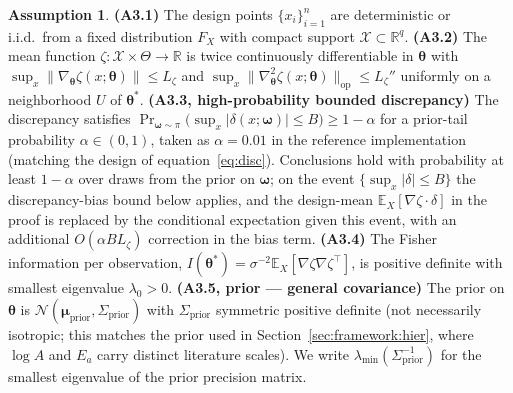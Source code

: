 \documentclass[12pt]{article}
\theoremstyle{plain}
\theoremstyle{definition}
\newtheorem{assumption}{Assumption}
\theoremstyle{remark}
\newcommand{\R}{\mathbb{R}}
\newcommand{\E}{\mathbb{E}}
\newcommand{\norm}[1]{\lVert #1 \rVert}
\begin{document}
\begin{assumption}\label{ass:thm3}
\textbf{(A3.1)} The design points $\{x_i\}_{i=1}^n$ are deterministic
or i.i.d.~from a fixed distribution $F_X$ with compact support
$\mathcal{X}\subset\R^q$.
\textbf{(A3.2)} The mean function $\zeta:\mathcal{X}\times\Theta\to\R$
is twice continuously differentiable in $\boldsymbol\theta$ with
$\sup_x\norm{\nabla_{\boldsymbol\theta}\zeta(x;\boldsymbol\theta)}\le
L_\zeta$ and $\sup_x\norm{\nabla^2_{\boldsymbol\theta}\zeta(x;\boldsymbol
\theta)}_{\mathrm{op}}\le L_\zeta''$ uniformly on a neighborhood $U$
of $\boldsymbol\theta^*$.
\textbf{(A3.3, high-probability bounded discrepancy)} The discrepancy
satisfies $\Pr_{\boldsymbol\omega\sim\pi}\bigl(\sup_x|\delta(x;\boldsymbol
\omega)|\le B\bigr)\ge 1-\alpha$ for a prior-tail probability
$\alpha\in(0,1)$, taken as $\alpha=0.01$ in the reference implementation
(matching the design of equation~\eqref{eq:disc}).  Conclusions hold with
probability at least $1-\alpha$ over draws from the prior on
$\boldsymbol\omega$; on the event $\{\sup_x|\delta|\le B\}$ the
discrepancy-bias bound below applies, and the design-mean
$\E_X[\nabla\zeta\cdot\delta]$ in the proof is replaced by the conditional
expectation given this event, with an additional $O(\alpha B L_\zeta)$
correction in the bias term.
\textbf{(A3.4)} The Fisher information per observation,
$I(\boldsymbol\theta^*)=\sigma^{-2}\E_X[\nabla\zeta\nabla\zeta^\top]$,
is positive definite with smallest eigenvalue $\lambda_0>0$.
\textbf{(A3.5, prior — general covariance)} The prior on $\boldsymbol\theta$
is $\mathcal{N}(\boldsymbol\mu_{\mathrm{prior}},\Sigma_{\mathrm{prior}})$
with $\Sigma_{\mathrm{prior}}$ symmetric positive definite (not necessarily
isotropic; this matches the prior used in
Section~\ref{sec:framework:hier}, where $\log A$ and $E_a$ carry distinct
literature scales).  We write
$\lambda_{\min}(\Sigma_{\mathrm{prior}}^{-1})$ for the smallest eigenvalue
of the prior precision matrix.
\end{assumption}
\end{document}
